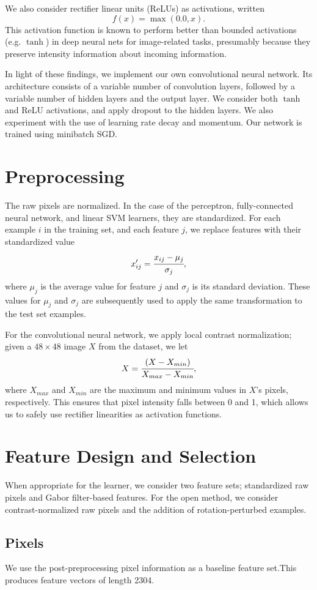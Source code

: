 \documentclass{acm_proc_article-sp}
\begin{document}
We also consider rectifier linear units (ReLUs) as activations, written $$f(x) = \max(0.0, x).$$ This activation function is known to perform better than bounded activations (e.g. $\tanh$) in deep neural nets for image-related tasks, presumably because they preserve intensity information about incoming information.\cite{Nair}

In light of these findings, we implement our own convolutional neural network. Its architecture consists of a variable number of convolution layers, followed by a variable number of hidden layers and the output layer. We consider both $\tanh$ and ReLU activations, and apply dropout to the hidden layers.  We also experiment with the use of learning rate decay and momentum. Our network is trained using minibatch SGD.

\section{Preprocessing}
The raw pixels are normalized. In the case of the perceptron, fully-connected neural network, and linear SVM learners, they are standardized. For each example $i$ in the training set, and each feature $j$, we replace features with their standardized value $$x'_{ij} = \cfrac{x_{ij} - \mu_{j}}{\sigma_{j}},$$ where $\mu_j$ is the average value for feature $j$ and $\sigma_j$ is its standard deviation. These values for $\mu_j$ and $\sigma_j$ are subsequently used to apply the same transformation to the test set examples.

For the convolutional neural network, we apply local contrast normalization; given a $48\times48$ image $X$ from the dataset, we let $$X = \cfrac{(X - X_{min})}{X_{max} - X_{min}},$$ where $X_{max}$ and $X_{min}$ are the maximum and minimum values in $X$'s pixels, respectively. This ensures that pixel intensity falls between 0 and 1, which allows us to safely use rectifier linearities as activation functions.

\section{Feature Design and Selection}
When appropriate for the learner, we consider two feature sets; standardized raw pixels and Gabor filter-based features. For the open method, we consider contrast-normalized raw pixels and the addition of rotation-perturbed examples.

\subsection{Pixels}
We use the post-preprocessing pixel information as a baseline feature set.This produces feature vectors of length 2304. 
\end{document}

